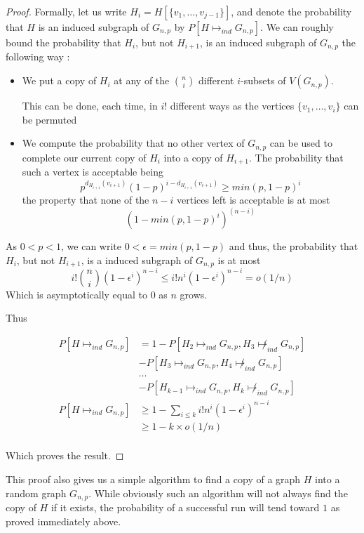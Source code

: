 \begin{proof}
  Formally, let us write $H_i = H[\{v_1,\dots,v_{j-1}\}]$, and denote
  the probability that $H$ is an induced subgraph of $G_{n,p}$ by $P[H
    \mapsto_{ind} G_{n,p}]$. We can roughly bound the probability that $H_i$, but not $H_{i+1}$, is an induced subgraph of $G_{n,p}$ the following way :

  \begin{itemize}
  \item We put a copy of $H_i$ at any of the $\binom n i$ different $i$-subsets of $V(G_{n,p})$.

    This can be done, each time, in $i!$ different ways as the vertices $\{v_1, \dots, v_i\}$ can be permuted

  \item We compute the probability that no other vertex of $G_{n,p}$ can be used to complete our current copy of $H_i$ into a copy of $H_{i+1}$. The probability that such a vertex is acceptable being
    $$p^{d_{H_{i+1}}(v_{i+1})}(1-p)^{i-d_{H_{i+1}}(v_{i+1})}\geq min(p, 1-p)^i$$
    the property that none of the $n-i$ vertices left is acceptable is at most
    $$\left({ 1- min(p, 1-p)^i } \right)^{(n-i)}$$
  \end{itemize}

  As $0<p<1$, we can write $0<\epsilon = min(p, 1-p)$ and thus, the probability that $H_i$, but not $H_{i+1}$, is a induced subgraph of $G_{n,p}$ is at most $$i!\binom n i (1-\epsilon^i)^{n-i}\leq i! n^i (1-\epsilon^i)^{n-i} = o(1/n)$$
Which is asymptotically equal to 0 as $n$ grows.

Thus

\begin{align*}
  P[H \mapsto_{ind} G_{n,p}]&=1 - P[H_2 \mapsto_{ind} G_{n,p}, H_3\not \mapsto_{ind} G_{n,p}]\\
  &-P[H_3 \mapsto_{ind} G_{n,p}, H_4\not \mapsto_{ind} G_{n,p}]\\
  &\dots\\
  &-P[H_{k-1} \mapsto_{ind} G_{n,p}, H_k\not \mapsto_{ind} G_{n,p}]\\
  P[H \mapsto_{ind} G_{n,p}]&\geq 1-\sum_{i\leq k}i!n^i(1-\epsilon^i)^{n-i}\\
  &\geq 1-k\times o(1/n)\\
\end{align*}

Which proves the result.

\end{proof}

This proof also gives us a simple algorithm to find a copy of a graph $H$ into a random graph $G_{n,p}$. While obviously such an algorithm will not always find the copy of $H$ if it exists, the probability of a successful run will tend toward $1$ as proved immediately above.


